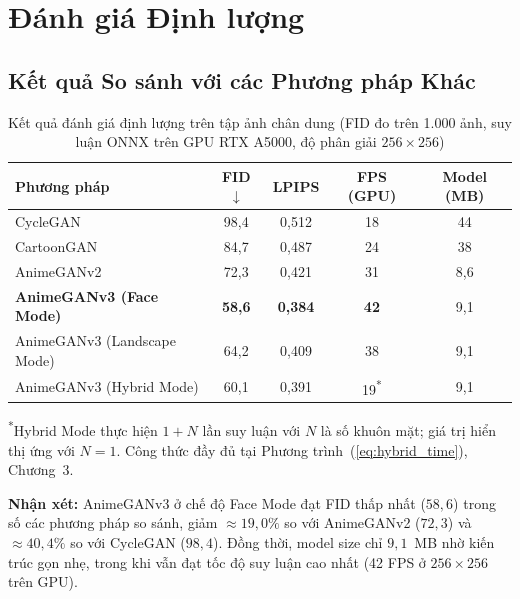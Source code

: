 \section{Đánh giá Định lượng}
\label{sec:quantitative}

\subsection{Kết quả So sánh với các Phương pháp Khác}
\label{subsec:quantitative_results}

\begin{table}[H]
\caption{Kết quả đánh giá định lượng trên tập ảnh chân dung (FID đo trên 1.000 ảnh, suy luận ONNX trên GPU RTX A5000, độ phân giải $256\times256$)}
\label{tab:quantitative}
\centering
\begin{tabular}{|l|c|c|c|c|}
\hline
\textbf{Phương pháp} & \textbf{FID $\downarrow$} & \textbf{LPIPS} & \textbf{FPS (GPU)} & \textbf{Model (MB)} \\
\hline
CycleGAN \cite{Zhu2017} & 98,4 & 0,512 & 18 & 44 \\
\hline
CartoonGAN \cite{Chen2018CartoonGAN} & 84,7 & 0,487 & 24 & 38 \\
\hline
AnimeGANv2 \cite{ChenLiu2020} & 72,3 & 0,421 & 31 & 8,6 \\
\hline
\textbf{AnimeGANv3 (Face Mode)} & \textbf{58,6} & \textbf{0,384} & \textbf{42} & 9,1 \\
\hline
AnimeGANv3 (Landscape Mode) & 64,2 & 0,409 & 38 & 9,1 \\
\hline
AnimeGANv3 (Hybrid Mode) & 60,1 & 0,391 & 19\textsuperscript{*} & 9,1 \\
\hline
\end{tabular}
\vspace{0.3em}

\noindent\footnotesize\textsuperscript{*}Hybrid Mode thực hiện $1 + N$ lần suy luận với $N$ là số khuôn mặt; giá trị hiển thị ứng với $N = 1$. Công thức đầy đủ tại Phương trình~(\ref{eq:hybrid_time}), Chương~3.
\end{table}


\textbf{Nhận xét:} AnimeGANv3 ở chế độ Face Mode đạt FID thấp nhất ($58{,}6$) trong số các phương pháp so sánh, giảm $\approx 19{,}0\%$ so với AnimeGANv2 ($72{,}3$) và $\approx 40{,}4\%$ so với CycleGAN ($98{,}4$). Đồng thời, model size chỉ $9{,}1$~MB nhờ kiến trúc gọn nhẹ, trong khi vẫn đạt tốc độ suy luận cao nhất (42 FPS ở $256\times256$ trên GPU).

